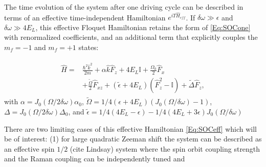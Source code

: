 
The time evolution of the system after one driving cycle can be described in terms of an effective time-independent Hamiltonian $e^{iT\hat{H}_{eff}}$. If $\delta\omega \gg \epsilon$ and $\delta\omega \gg 4E_L$, this effective Floquet Hamiltonian retains the form of \ref{Eq:SOCone} with renormalized coefficients, and an additional term that explicitly couples the $m_f=-1$ and $m_f=+1$ states:

\begin{align}
	\begin{split}
		\hat{H} = &\frac{\hbar^2\hat{k}^2}{2m} + \alpha\hat{k}\hat{F}_z +4E_L\mathbb{I} + \frac{\Omega_0}{2}\hat{F}_x \\
		&+ \frac{\tilde{\Omega}}{2}\hat{F}_{xz} +(\tilde{\epsilon}+4E_L)(\hat{F}_z^2-\mathbb{I}) +\tilde{\Delta}\hat{F}_z, 
		\label{Eq:SOCeff}
	\end{split}
\end{align}	
%
with $\alpha= J_0(\Omega/2\delta\omega)\alpha_0$, $\tilde{\Omega}=1/4(\epsilon+4E_L) (J_0(\Omega/\delta\omega)-1)$, $\Delta=J_0(\Omega/2\delta\omega)\Delta_0$, and $\tilde{\epsilon}= 1/4(4E_L-\epsilon) - 
1/4(4E_L + 3 \epsilon) J_0( \Omega/\delta\omega)$


There are two limiting cases of this effective Hamiltonian \ref{Eq:SOCeff} which will be of interest: (1) for large quadratic Zeeman shift the system can be described as an effective spin $1/2$ (cite Lindsay) system where the spin orbit coupling strength and the Raman coupling can be independently tuned and 




